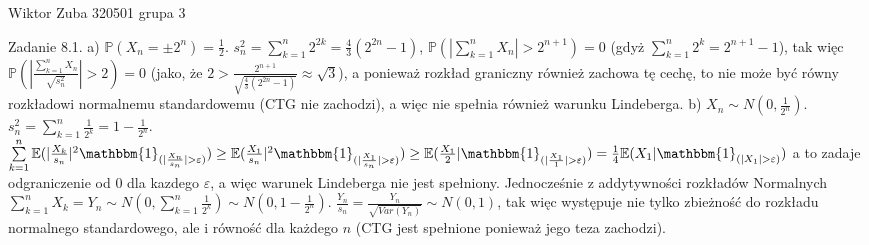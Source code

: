 \documentclass{article}
\begin{document}
Wiktor Zuba 320501 grupa 3
\newline

Zadanie 8.1.
\newline
\newline
a) $\mathbb{P}(X_n=\pm2^n)=\frac{1}{2}$. $s_n^2=\sum\limits_{k=1}^{n}2^{2k}=\frac{4}{3}(2^{2n}-1)$,\newline
$\mathbb{P}(|\sum\limits_{k=1}^{n}X_n|>2^{n+1})=0$ (gdyż $\sum\limits_{k=1}^{n}2^k=2^{n+1}-1$),\newline
tak więc $\mathbb{P}(|\frac{\sum\limits_{k=1}^{n}X_n}{\sqrt{s_n^2}}|>2)=0$ (jako, że $2>\frac{2^{n+1}}{\sqrt{\frac{4}{3}(2^{2n}-1)}}\approx\sqrt{3}$),
a ponieważ rozkład graniczny również zachowa tę cechę, to nie może być równy rozkładowi normalnemu standardowemu (CTG nie zachodzi), a więc nie spełnia również warunku Lindeberga.\newline
b) $X_n\sim N(0,\frac{1}{2^n})$. $s_n^2=\sum\limits_{k=1}^{n}\frac{1}{2^k}=1-\frac{1}{2^n}$.\newline
$\sum\limits_{k=1}^{n}\mathbb{E}(|\frac{X_k}{s_n}|^2\mathbbm{1}_{(|\frac{X_n}{s_n}|>\varepsilon)})\ge\mathbb{E}(\frac{X_1}{s_n}|^2\mathbbm{1}_{(|\frac{X_1}{s_n}|>\varepsilon)})\ge
\mathbb{E}(\frac{X_1}{2}|\mathbbm{1}_{(|\frac{X_1}{1}|>\varepsilon)})=\frac{1}{4}\mathbb{E}(X_1|\mathbbm{1}_{(|X_1|>\varepsilon)})$ a to zadaje odgraniczenie od 0 dla kazdego $\varepsilon$,
a więc warunek Lindeberga nie jest spełniony.\newline
Jednocześnie z addytywności rozkładów Normalnych $\sum\limits_{k=1}^{n}X_k=Y_n\sim N(0,\sum\limits_{k=1}^{n}\frac{1}{2^k})\sim N(0,1-\frac{1}{2^n})$.\newline
$\frac{Y_n}{s_n}=\frac{Y_n}{\sqrt{Var(Y_n)}}\sim N(0,1)$, tak więc występuje nie tylko zbieżność do rozkładu normalnego standardowego, ale i równość dla każdego $n$
(CTG jest spełnione ponieważ jego teza zachodzi).
\newline
\end{document}
